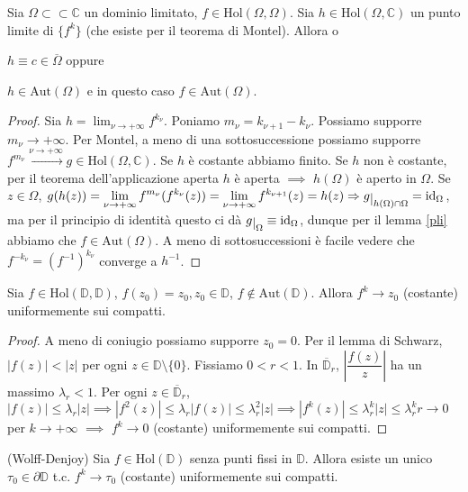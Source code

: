 \begin{prop}
  Sia $\Omega \subset \subset \mathbb{C}$ un dominio limitato, $f \in \text{Hol}(\Omega, \Omega)$. Sia $h \in \text{Hol}(\Omega, \mathbb{C})$ un punto limite di $\{f^k\}$ (che esiste per il teorema di Montel). Allora o
  \begin{nlist}
    \item $h \equiv c \in \overline{\Omega}$ oppure
    \item $h \in \text{Aut}(\Omega)$ e in questo caso $f \in \text{Aut}(\Omega)$.
  \end{nlist}
\end{prop}

\begin{proof}
  Sia $\displaystyle h=\lim_{\nu \rightarrow +\infty} f^{k_{\nu}}$. Poniamo $m_{\nu}=k_{\nu+1}-k_{\nu}$. Possiamo supporre $m_{\nu} \rightarrow +\infty$. Per Montel, a meno di una sottosuccessione possiamo supporre $f^{m_{\nu}} \xrightarrow{\nu \rightarrow +\infty} g \in \text{Hol}(\Omega, \mathbb{C})$.
  Se $h$ è costante abbiamo finito. Se $h$ non è costante, per il teorema dell'applicazione aperta $h$ è aperta $\implies$ $h(\Omega)$ è aperto in $\Omega$.
  Se $z \in \Omega$, $\displaystyle g(h(z))=\lim_{\nu \rightarrow +\infty} f^{m_{\nu}}(f^{k_{\nu}}(z))=\lim_{\nu \rightarrow +\infty} f^{k_{\nu+1}}(z)=h(z) \implies g\restrict{h(\Omega) \cap \Omega}=\id_{\Omega}$,
  ma per il principio di identità questo ci dà $g\restrict{\Omega} \equiv \id_{\Omega}$, dunque per il lemma \ref{pli} abbiamo che $f \in \text{Aut}(\Omega)$. A meno di sottosuccessioni è facile vedere che $f^{-k_{\nu}}=(f^{-1})^{k_{\nu}}$ converge a $h^{-1}$.
\end{proof}

\begin{prop}
  Sia $f \in \text{Hol}(\mathbb{D}, \mathbb{D})$, $f(z_0)=z_0, z_0 \in \mathbb{D}$, $f\not\in \text{Aut}(\mathbb{D})$. Allora $f^k \rightarrow z_0$ (costante) uniformemente sui compatti.
\end{prop}

\begin{proof}
  A meno di coniugio possiamo supporre $z_0=0$. Per il lemma di Schwarz, $|f(z)|<|z|$ per ogni $z \in \mathbb{D}\setminus\{0\}$. Fissiamo $0<r<1$. In $\overline{\mathbb{D}}_r$, $\left|\dfrac{f(z)}{z}\right|$ ha un massimo $\lambda_r<1$.
  Per ogni $z \in \overline{\mathbb{D}}_r$, $|f(z)| \le \lambda_r|z| \implies |f^2(z)| \le \lambda_r|f(z)| \le \lambda_r^2|z| \implies |f^k(z)| \le \lambda_r^k|z| \le \lambda_r^kr \rightarrow 0$ per $k \rightarrow +\infty$ $\implies$ $f^k \rightarrow 0$ (costante) uniformemente sui compatti.
\end{proof}

\begin{thm}
  (Wolff-Denjoy) Sia $f \in \text{Hol}(\mathbb{D})$ senza punti fissi in $\mathbb{D}$. Allora esiste un unico $\tau_0 \in \partial\mathbb{D}$ t.c. $f^k \rightarrow \tau_0$ (costante) uniformemente sui compatti.
\end{thm}
